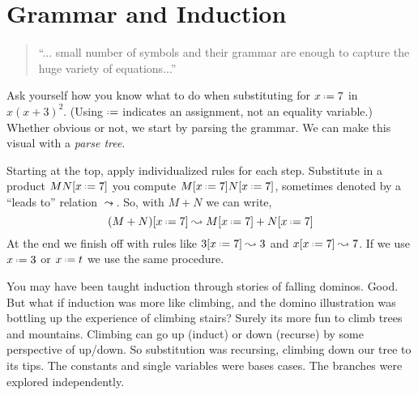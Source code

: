 \chapter{Grammar and Induction}

\begin{quote}
``... small number
of symbols and their grammar are enough to capture the huge
variety of equations...''
\end{quote}

Ask yourself how you know what to do when  
substituting for $x\defeq 7$ in $x(x+3)^{2}$.
(Using $\defeq$ indicates an assignment, not an equality variable.)
Whether obvious or not, we start by parsing the grammar.  We can make this 
visual with a \emph{parse tree}.
\begin{center}
\end{center}
Starting at the top, apply individualized 
rules for each step.  Substitute in a product $MN[x\defeq 7]$ you compute 
$M[x\defeq 7]N[x\defeq 7]$,
sometimes denoted by a ``leads to'' relation $\leadsto$. So,
with $M+N$ we can write,
\[
    (M+N)[x\defeq 7]\leadsto M[x\defeq 7]+N[x\defeq 7]
\]
At the end we finish off with rules like $3[x\defeq 7]\leadsto 3$ and $x[x\defeq 7]\leadsto 7$.
If we use $x\defeq 3$ or $x\defeq t$ we use the same procedure.

You may have been taught induction through stories of falling 
dominos.  Good.  But what if induction was more like climbing, 
and the domino illustration was bottling up the experience
of climbing stairs?  Surely its more fun to climb trees and mountains.
Climbing can go up (induct) or down (recurse) by some perspective of up/down.
So substitution was recursing, climbing down our tree to its tips.  The constants 
and single variables were bases cases.  The branches were explored independently.


